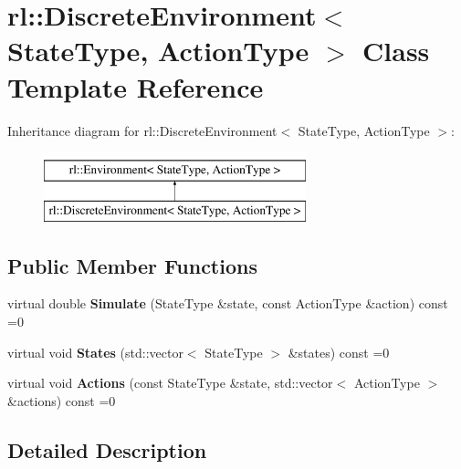 \hypertarget{classrl_1_1_discrete_environment}{}\section{rl\+:\+:Discrete\+Environment$<$ State\+Type, Action\+Type $>$ Class Template Reference}
\label{classrl_1_1_discrete_environment}
Inheritance diagram for rl\+:\+:Discrete\+Environment$<$ State\+Type, Action\+Type $>$\+:\begin{figure}[H]
\begin{center}
\leavevmode
\includegraphics[height=2.000000cm]{classrl_1_1_discrete_environment}
\end{center}
\end{figure}
\subsection*{Public Member Functions}
\begin{DoxyCompactItemize}
\item 
\hypertarget{classrl_1_1_discrete_environment_a98f98b36d1a5148175e4307bba402f5e}{}\label{classrl_1_1_discrete_environment_a98f98b36d1a5148175e4307bba402f5e} 
virtual double {\bfseries Simulate} (State\+Type \&state, const Action\+Type \&action) const =0
\item 
\hypertarget{classrl_1_1_discrete_environment_a2cd36d24262dfc595574708f1118760f}{}\label{classrl_1_1_discrete_environment_a2cd36d24262dfc595574708f1118760f} 
virtual void {\bfseries States} (std\+::vector$<$ State\+Type $>$ \&states) const =0
\item 
\hypertarget{classrl_1_1_discrete_environment_a46561149e83e67db9e83d6d6169a9087}{}\label{classrl_1_1_discrete_environment_a46561149e83e67db9e83d6d6169a9087} 
virtual void {\bfseries Actions} (const State\+Type \&state, std\+::vector$<$ Action\+Type $>$ \&actions) const =0
\end{DoxyCompactItemize}


\subsection{Detailed Description}
